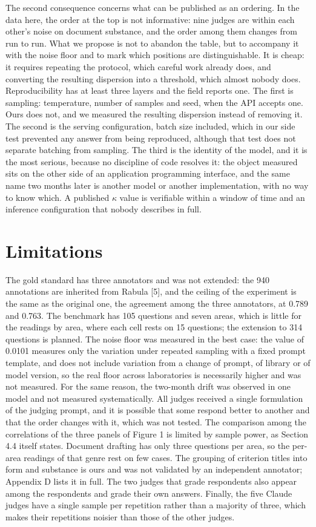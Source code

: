 \documentclass{IOS-Book-Article}
\begin{document}
The second consequence concerns what can be published as an ordering. In the data here, the order at the top is not informative: nine judges are within each other's noise on document substance, and the order among them changes from run to run. What we propose is not to abandon the table, but to accompany it with the noise floor and to mark which positions are distinguishable. It is cheap: it requires repeating the protocol, which careful work already does, and converting the resulting dispersion into a threshold, which almost nobody does. Reproducibility has at least three layers and the field reports one. The first is sampling: temperature, number of samples and seed, when the API accepts one. Ours does not, and we measured the resulting dispersion instead of removing it. The second is the serving configuration, batch size included, which in our side test prevented any answer from being reproduced, although that test does not separate batching from sampling. The third is the identity of the model, and it is the most serious, because no discipline of code resolves it: the object measured sits on the other side of an application programming interface, and the same name two months later is another model or another implementation, with no way to know which. A published $\kappa$ value is verifiable within a window of time and an inference configuration that nobody describes in full.

\section{Limitations}

The gold standard has three annotators and was not extended: the 940 annotations are inherited from Rabula [5], and the ceiling of the experiment is the same as the original one, the agreement among the three annotators, at 0.789 and 0.763. The benchmark has 105 questions and seven areas, which is little for the readings by area, where each cell rests on 15 questions; the extension to 314 questions is planned. The noise floor was measured in the best case: the value of 0.0101 measures only the variation under repeated sampling with a fixed prompt template, and does not include variation from a change of prompt, of library or of model version, so the real floor across laboratories is necessarily higher and was not measured. For the same reason, the two-month drift was observed in one model and not measured systematically. All judges received a single formulation of the judging prompt, and it is possible that some respond better to another and that the order changes with it, which was not tested. The comparison among the correlations of the three panels of Figure 1 is limited by sample power, as Section 4.4 itself states. Document drafting has only three questions per area, so the per-area readings of that genre rest on few cases. The grouping of criterion titles into form and substance is ours and was not validated by an independent annotator; Appendix D lists it in full. The two judges that grade respondents also appear among the respondents and grade their own answers. Finally, the five Claude judges have a single sample per repetition rather than a majority of three, which makes their repetitions noisier than those of the other judges.
\end{document}
